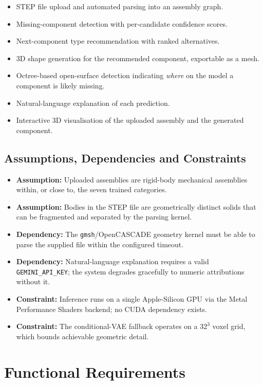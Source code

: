 \documentclass[12pt,oneside,a4paper]{report}
\begin{document}
\begin{itemize}[leftmargin=1.5em]
\item STEP file upload and automated parsing into an assembly graph.
\item Missing-component detection with per-candidate confidence scores.
\item Next-component type recommendation with ranked alternatives.
\item 3D shape generation for the recommended component, exportable as a mesh.
\item Octree-based open-surface detection indicating \emph{where} on the
model a component is likely missing.
\item Natural-language explanation of each prediction.
\item Interactive 3D visualisation of the uploaded assembly and the
generated component.
\end{itemize}

\subsection{Assumptions, Dependencies and Constraints}

\begin{itemize}[leftmargin=1.5em]
\item \textbf{Assumption:} Uploaded assemblies are rigid-body mechanical
assemblies within, or close to, the seven trained categories.
\item \textbf{Assumption:} Bodies in the STEP file are geometrically distinct
solids that can be fragmented and separated by the parsing kernel.
\item \textbf{Dependency:} The \texttt{gmsh}/OpenCASCADE geometry kernel must
be able to parse the supplied file within the configured timeout.
\item \textbf{Dependency:} Natural-language explanation requires a valid
\texttt{GEMINI\_API\_KEY}; the system degrades gracefully to numeric
attributions without it.
\item \textbf{Constraint:} Inference runs on a single Apple-Silicon GPU via
the Metal Performance Shaders backend; no CUDA dependency exists.
\item \textbf{Constraint:} The conditional-VAE fallback operates on a
$32^3$ voxel grid, which bounds achievable geometric detail.
\end{itemize}

\section{Functional Requirements}
\end{document}
